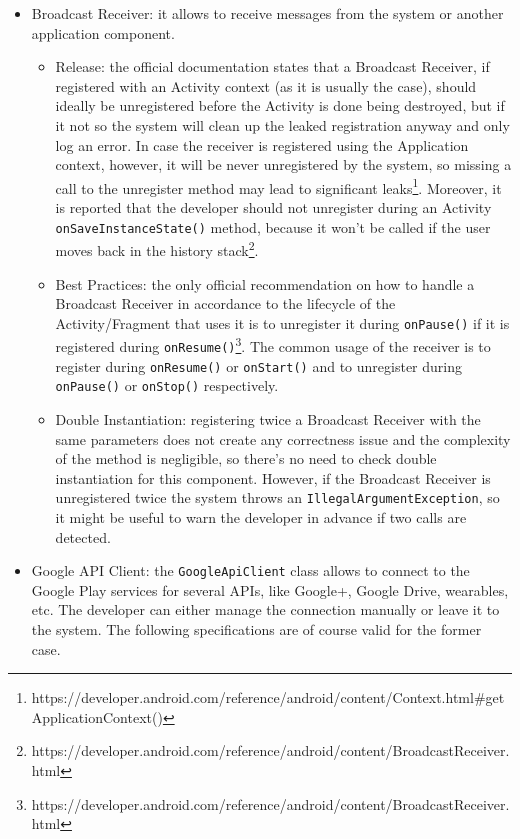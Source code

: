 \documentclass[11pt,a4paper,notitlepage]{article}
\begin{document}
\begin{itemize}
	\item Broadcast Receiver: it allows to receive messages from the system or another application component.
	\begin{itemize}
		\item Release: the official documentation states that a Broadcast Receiver, if registered with an Activity context (as it is usually the case), should ideally be unregistered before the Activity is done being destroyed, but if it not so the system will clean up the leaked registration anyway and only log an error. In case the receiver is registered using the Application context, however, it will be never unregistered by the system, so missing a call to the unregister method may lead to significant leaks\footnote{https://developer.android.com/reference/android/content/Context.html\#getApplicationContext()}. Moreover, it is reported that the developer should not unregister during an Activity \texttt{onSaveInstanceState()} method, because it won't be called if the user moves back in the history stack\footnote{https://developer.android.com/reference/android/content/BroadcastReceiver.html}.
		\item Best Practices: the only official recommendation on how to handle a Broadcast Receiver in accordance to the lifecycle of the Activity/Fragment that uses it is to unregister it during \texttt{onPause()} if it is registered during \texttt{onResume()}\footnote{https://developer.android.com/reference/android/content/BroadcastReceiver.html}. The common usage of the receiver is to register during \texttt{onResume()} or \texttt{onStart()} and to unregister during \texttt{onPause()} or \texttt{onStop()} respectively.
		\item Double Instantiation: registering twice a Broadcast Receiver with the same parameters does not create any correctness issue and the complexity of the method is negligible, so there's no need to check double instantiation for this component. However, if the Broadcast Receiver is unregistered twice the system throws an \texttt{IllegalArgumentException}, so it might be useful to warn the developer in advance if two calls are detected.
	\end{itemize}
	\item Google API Client: the \texttt{GoogleApiClient} class allows to connect to the Google Play services for several APIs, like Google+, Google Drive, wearables, etc. The developer can either manage the connection manually or leave it to the system. The following specifications are of course valid for the former case.

\end{itemize}
\end{document}
